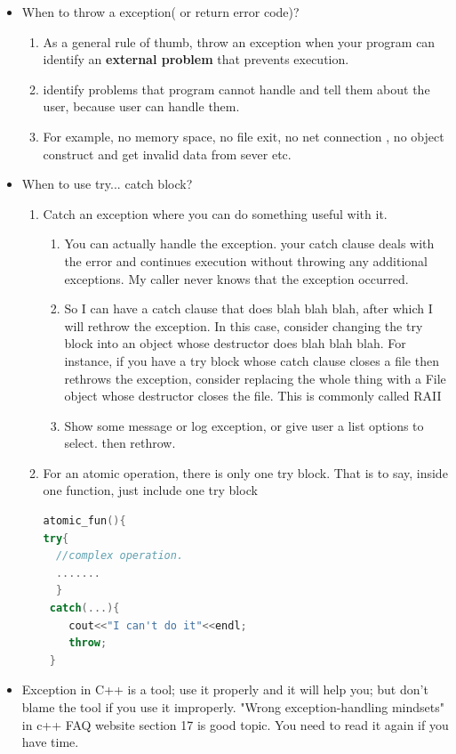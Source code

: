 \documentclass[a4paper,12pt,twoside]{book}
\begin{document}
\begin{itemize}
\item When to throw a exception( or return error code)?
\begin{enumerate}
\item As a general rule of thumb, throw an exception when your program can identify an \textbf{external problem} that prevents execution.
\item identify problems that program cannot handle and tell them about the user, because user can handle them.
\item For example, no memory space, no file exit, no net connection , no object construct and get invalid data from sever etc.
\end{enumerate}

\item When to use try... catch block?
\begin{enumerate}
\item Catch an exception where you can do something useful with it.
\begin{enumerate}
\item You can actually handle the exception. your catch clause deals with the error and continues execution without throwing any additional exceptions. My caller never knows that the exception occurred.
\item So I can have a catch clause that does blah blah blah, after which I will rethrow the exception. In this case, consider changing the try block into an object whose destructor does blah blah blah. For instance, if you have a try block whose catch clause closes a file then rethrows the exception, consider replacing the whole thing with a File object whose destructor closes the file. This is commonly called RAII
\item Show some message or log exception, or give user a list options to select.  then rethrow.
\end{enumerate}

\item For an atomic operation, there is only one try block. That is to say, inside one function, just include one try block
\begin{lstlisting}[frame=single, language=c++]
atomic_fun(){
try{
  //complex operation.
  .......
  }
 catch(...){
    cout<<"I can't do it"<<endl;
    throw;
 }
\end{lstlisting}
\end{enumerate}

\item Exception in C++ is a tool; use it properly and it will help you; but don't blame the tool if you use it improperly. "Wrong exception-handling mindsets" in c++ FAQ website section 17 is good topic. You need to read it again if you have time.

\end{itemize}
\end{document}
